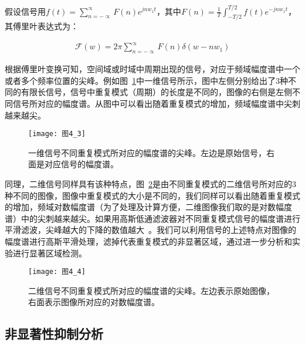 假设信号用$f(t)=\sum_{n=-\propto}^{\propto}F(n)e^{jnw_{1}t}$，其中$F(n)=\frac{1}{T}\int_{-T/2}^{T/2}f(t)e^{-jnw_{1}t}$，其傅里叶表达式为：
\begin{linenomath}
\begin{align}
\mathcal{F}(w)=2\pi\sum_{n=-\propto}^{\propto}F(n)\delta(w-nw_{1})
\label{式4_1}
\end{align}
\end{linenomath}
根据傅里叶变换可知，空间域或时域中周期出现的信号，对应于频域幅度谱中一个或者多个频率位置的尖峰。例如图~\ref{图4_3}中一维信号所示，图中左侧分别给出了3种不同的有限长信号，信号中重复模式（周期）的长度是不同的，图像的右侧是左侧不同信号所对应的幅度谱。从图中可以看出随着重复模式的增加，频域幅度谱中尖刺越来越尖。
\begin{figure}[h]
  \centering
  \texttt{[image: 图4\_3]}
  \caption{一维信号不同重复模式所对应的幅度谱的尖峰。左边是原始信号，右面是对应信号的幅度谱。}   
  \label{图4_3} 
\end{figure}
同理，二维信号同样具有该种特点，图~\ref{图4_4}是由不同重复模式的二维信号所对应的3种不同的图像，图像中重复模式的大小是不同的，我们同样可以看出随着重复模式的增加，频域对数幅度谱（为了处理及计算方便，二维图像我们取的是对数幅度谱）中的尖刺越来越尖。如果用高斯低通滤波器对不同重复模式信号的幅度谱进行平滑滤波，尖峰越大的下降的数值越大~\cite{LiJianTPAMI2013Scale}。我们可以利用信号的上述特点对图像的幅度谱进行高斯平滑处理，滤掉代表重复模式的非显著区域，通过进一步分析和实验进行显著区域检测。
\begin{figure}[h]
  \centering
  \texttt{[image: 图4\_4]}
  \caption{二维信号不同重复模式所对应的幅度谱的尖峰。左边表示原始图像，右面表示图像所对应的对数幅度谱。}   
  \label{图4_4} 
\end{figure}

\subsection{非显著性抑制分析}
\label{4_1_2}

